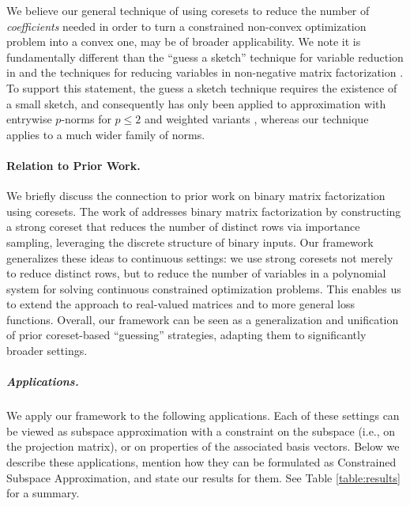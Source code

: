 \documentclass[11pt]{article}
\theoremstyle{plain}
\theoremstyle{plain}
\theoremstyle{definition}
\theoremstyle{plain}
\theoremstyle{remark}
\begin{document}
We believe our general technique of using coresets to reduce the number of {\it coefficients} needed in order to turn a constrained non-convex optimization problem into a convex one, may be of broader applicability. We note it is fundamentally different than the ``guess a sketch'' technique for variable reduction in \cite{RSW16,BBBKLW19,regW19,mw20} and the techniques for reducing variables in non-negative matrix factorization \cite{m16}. To support this statement, the guess a sketch technique requires the existence of a small sketch, and consequently has only been applied to approximation with entrywise $p$-norms for $p \leq 2$ and weighted variants \cite{RSW16,BBBKLW19,mw20}, whereas our technique applies to a much wider family of norms. 
\vspace{-6pt}
\paragraph{Relation to Prior Work.}
We briefly discuss the connection to prior work on binary matrix factorization using coresets.
The work of \cite{VVWZ-23-bin_mat_fac} addresses binary matrix factorization by constructing a strong coreset that reduces the number of distinct rows via importance sampling, leveraging the discrete structure of binary inputs. 
Our framework generalizes these ideas to continuous settings: we use strong coresets not merely to reduce distinct rows, but to reduce the number of variables in a polynomial system for solving continuous constrained optimization problems. 
This enables us to extend the approach to real-valued matrices and to more general loss functions.
Overall, our framework can be seen as a generalization and unification of prior coreset-based ``guessing'' strategies, adapting them to significantly broader settings.

\vspace{-6pt}
\subparagraph*{Applications.} We apply our framework to the following applications.  Each of these settings can be viewed as subspace approximation with a constraint on the subspace (i.e., on the projection matrix), or on properties of the associated basis vectors. Below we describe these applications, mention how they can be formulated as Constrained Subspace Approximation, and state our results for them. See Table \ref{table:results} for a summary.
\end{document}

